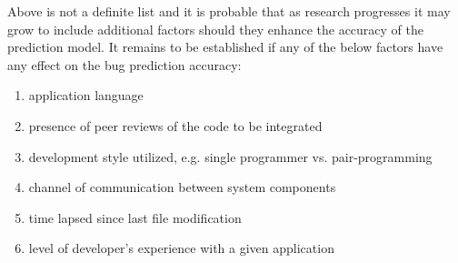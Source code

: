 Above is not a definite list and it is probable that as research progresses it may grow to include additional factors should they enhance the accuracy of the prediction model. It remains to be established if any of the below factors have any effect on the bug prediction accuracy:
\begin{enumerate}
\item application language
\item presence of peer reviews of the code to be integrated
\item development style utilized, e.g. single programmer vs. pair-programming
\item channel of communication between system components
\item \label{fileAge} time lapsed since last file modification
\item \label{developerMastery}level of developer's experience with a given application
\end{enumerate}